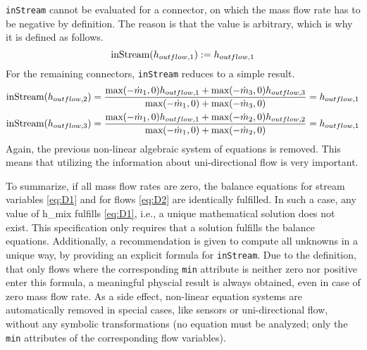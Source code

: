 \lstinline!inStream! cannot be evaluated for a connector, on which
the mass flow rate has to be negative by definition. The reason is that
the value is arbitrary, which is why it is defined as follows.
\begin{equation*}
\text{\lstinline!inStream!}(h_{outflow,1}):=h_{outflow,1}
\end{equation*}
For the remaining connectors, \lstinline!inStream! reduces to a simple result.
\begin{align*}
\text{\lstinline!inStream!}(h_{outflow,2}) &= \frac{\text{max}(-\dot{m}_1,0)h_{outflow,1}+\text{max}(-\dot{m}_3,0)h_{outflow,3}}{\text{max}(-\dot{m}_1,0)+\text{max}(-\dot{m}_3,0)}
  = h_{outflow,1}\\
\text{\lstinline!inStream!}(h_{outflow,3}) &= \frac{\text{max}(-\dot{m}_1,0)h_{outflow,1}+\text{max}(-\dot{m}_2,0)h_{outflow,2}}{\text{max}(-\dot{m}_1,0)+\text{max}(-\dot{m}_2,0)}
  = h_{outflow,1}
\end{align*}
Again, the previous non-linear algebraic system of equations is removed.
This means that utilizing the information about uni-directional flow is
very important.

To summarize, if all mass flow rates are zero, the balance equations for
stream variables \cref{eq:D1} and for flows \cref{eq:D2} are identically fulfilled. In
such a case, any value of h\_mix fulfills \cref{eq:D1}, i.e., a unique
mathematical solution does not exist. This specification only requires
that a solution fulfills the balance equations. Additionally, a
recommendation is given to compute all unknowns in a unique way, by
providing an explicit formula for \lstinline!inStream!. Due to the
definition, that only flows where the corresponding \lstinline!min! attribute is
neither zero nor positive enter this formula, a meaningful physcial
result is always obtained, even in case of zero mass flow rate. As a
side effect, non-linear equation systems are automatically removed in
special cases, like sensors or uni-directional flow, without any
symbolic transformations (no equation must be analyzed; only the
\lstinline!min! attributes of the corresponding flow variables).
